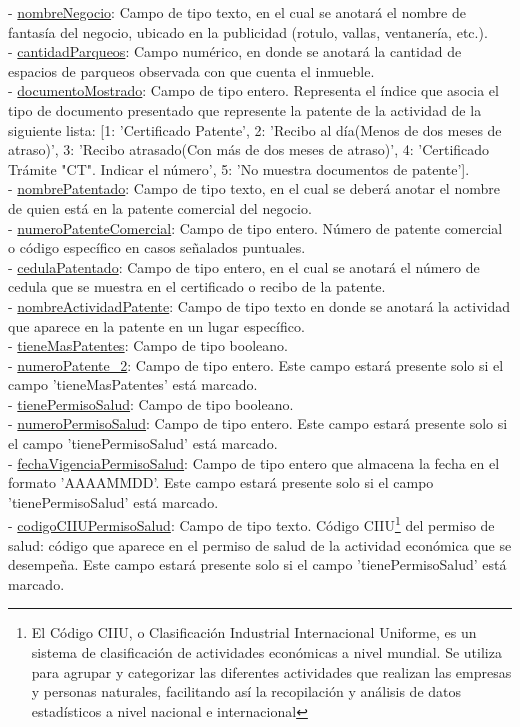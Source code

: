 - \underline{nombreNegocio}:  Campo de tipo texto, en el cual se anotará el nombre de fantasía del negocio, ubicado en la publicidad (rotulo, vallas, ventanería, etc.). \\
- \underline{cantidadParqueos}: Campo numérico, en donde se anotará la cantidad de espacios de parqueos observada con que cuenta el inmueble. \\
- \underline{documentoMostrado}: Campo de tipo entero. Representa el índice que asocia el tipo de documento presentado que represente la patente de la actividad de la siguiente lista: [1: 'Certificado Patente', 2: 'Recibo al día(Menos de dos meses de atraso)', 3: 'Recibo atrasado(Con más de dos meses de atraso)', 4: 'Certificado Trámite "CT". Indicar el número', 5: 'No muestra documentos de patente']. \\
- \underline{nombrePatentado}: Campo de tipo texto, en el cual se deberá anotar el nombre de quien está en la patente comercial del negocio. \\
- \underline{numeroPatenteComercial}: Campo de tipo entero. Número de patente comercial o código específico en casos señalados puntuales. \\
- \underline{cedulaPatentado}: Campo de tipo entero, en el cual se anotará el número de cedula que se muestra en el certificado o recibo de la patente. \\
- \underline{nombreActividadPatente}: Campo de tipo texto en donde se anotará la actividad que aparece en la patente en un lugar específico. \\
- \underline{tieneMasPatentes}: Campo de tipo booleano. \\
- \underline{numeroPatente\_2}: Campo de tipo entero. Este campo estará presente solo si el campo 'tieneMasPatentes' está marcado. \\
- \underline{tienePermisoSalud}: Campo de tipo booleano. \\
- \underline{numeroPermisoSalud}: Campo de tipo entero. Este campo estará presente solo si el campo 'tienePermisoSalud' está marcado. \\
- \underline{fechaVigenciaPermisoSalud}: Campo de tipo entero que almacena la fecha en el formato 'AAAAMMDD'. Este campo estará presente solo si el campo 'tienePermisoSalud' está marcado. \\
- \underline{codigoCIIUPermisoSalud}: Campo de tipo texto. Código CIIU\footnote{El Código CIIU, o Clasificación Industrial Internacional Uniforme, es un sistema de clasificación de actividades económicas a nivel mundial. Se utiliza para agrupar y categorizar las diferentes actividades que realizan las empresas y personas naturales, facilitando así la recopilación y análisis de datos estadísticos a nivel nacional e internacional} del permiso de salud: código que aparece en el permiso de salud de la actividad económica que se desempeña. Este campo estará presente solo si el campo 'tienePermisoSalud' está marcado. \\
